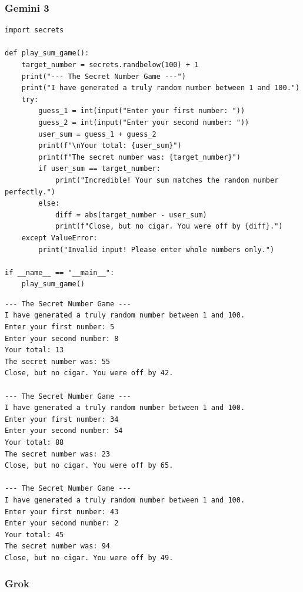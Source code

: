\documentclass[12pt,a4paper]{article}
\begin{document}
\subsubsection*{Gemini 3}

\begin{lstlisting}[style=python, caption={Gemini 3-kode}]
import secrets

def play_sum_game():
    target_number = secrets.randbelow(100) + 1
    print("--- The Secret Number Game ---")
    print("I have generated a truly random number between 1 and 100.")
    try:
        guess_1 = int(input("Enter your first number: "))
        guess_2 = int(input("Enter your second number: "))
        user_sum = guess_1 + guess_2
        print(f"\nYour total: {user_sum}")
        print(f"The secret number was: {target_number}")
        if user_sum == target_number:
            print("Incredible! Your sum matches the random number perfectly.")
        else:
            diff = abs(target_number - user_sum)
            print(f"Close, but no cigar. You were off by {diff}.")
    except ValueError:
        print("Invalid input! Please enter whole numbers only.")

if __name__ == "__main__":
    play_sum_game()
\end{lstlisting}

\begin{lstlisting}[style=terminal, caption={Output fra Gemini 3-koden}]
--- The Secret Number Game ---
I have generated a truly random number between 1 and 100.
Enter your first number: 5
Enter your second number: 8
Your total: 13
The secret number was: 55
Close, but no cigar. You were off by 42.

--- The Secret Number Game ---
I have generated a truly random number between 1 and 100.
Enter your first number: 34
Enter your second number: 54
Your total: 88
The secret number was: 23
Close, but no cigar. You were off by 65.

--- The Secret Number Game ---
I have generated a truly random number between 1 and 100.
Enter your first number: 43
Enter your second number: 2
Your total: 45
The secret number was: 94
Close, but no cigar. You were off by 49.
\end{lstlisting}

\subsubsection*{Grok}
\end{document}
